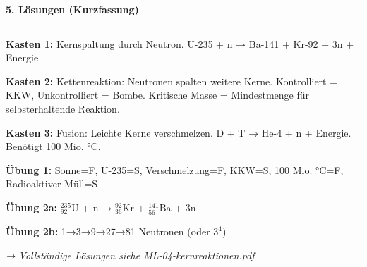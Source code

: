\documentclass[11pt, a4paper]{article}
\newcommand{\abschnitt}[1]{%
    \vspace{10pt}\noindent\textbf{\textcolor{physik}{\large #1}}\vspace{6pt}\hrule\vspace{8pt}
}
\begin{document}
\vspace{12pt}

\abschnitt{5. Lösungen (Kurzfassung)}

\textbf{Kasten 1:} Kernspaltung durch Neutron. U-235 + n → Ba-141 + Kr-92 + 3n + Energie

\textbf{Kasten 2:} Kettenreaktion: Neutronen spalten weitere Kerne. Kontrolliert = KKW, Unkontrolliert = Bombe. Kritische Masse = Mindestmenge für selbsterhaltende Reaktion.

\textbf{Kasten 3:} Fusion: Leichte Kerne verschmelzen. D + T → He-4 + n + Energie. Benötigt 100 Mio. °C.

\textbf{Übung 1:} Sonne=F, U-235=S, Verschmelzung=F, KKW=S, 100 Mio. °C=F, Radioaktiver Müll=S

\textbf{Übung 2a:} $^{235}_{92}$U + n → $^{92}_{36}$Kr + $^{141}_{56}$Ba + 3n

\textbf{Übung 2b:} 1→3→9→27→81 Neutronen (oder $3^4$)

\vspace{8pt}
\textit{→ Vollständige Lösungen siehe ML-04-kernreaktionen.pdf}
\end{document}
